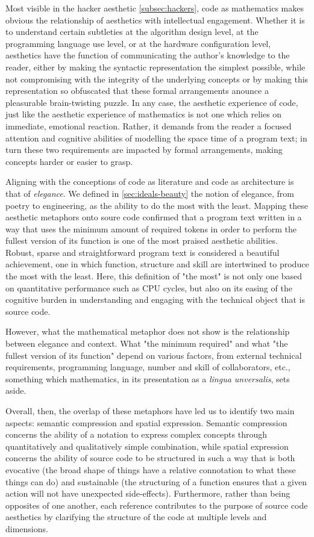 Most visible in the hacker aesthetic \ref{subsec:hackers}, code as mathematics makes obvious the relationship of aesthetics with intellectual engagement. Whether it is to understand certain subtleties at the algorithm design level, at the programming language use level, or at the hardware configuration level, aesthetics have the function of communicating the author's knowledge to the reader, either by making the syntactic representation the simplest possible, while not compromising with the integrity of the underlying concepts or by making this representation so obfuscated that these formal arrangements anounce a pleasurable brain-twisting puzzle. In any case, the aesthetic experience of code, just like the aesthetic experience of mathematics is not one which relies on immediate, emotional reaction. Rather, it demands from the reader a focused attention and cognitive abilities of modelling the space time of a program text; in turn these two requirements are impacted by formal arrangements, making concepts harder or easier to grasp.

Aligning with the conceptions of code as literature and code as architecture is that of \emph{elegance}. We defined in \ref{sec:ideals-beauty} the notion of elegance, from poetry to engineering, as the ability to do the most with the least. Mapping these aesthetic metaphors onto soure code confirmed that a program text written in a way that uses the minimum amount of required tokens in order to perform the fullest version of its function is one of the most praised aesthetic abilities. Robust, sparse and straightforward program text is considered a beautiful achievement, one in which function, structure and skill are intertwined to produce the most with the least. Here, this definition of "the most" is not only one based on quantitative performance such as CPU cycles, but also on its easing of the cognitive burden in understanding and engaging with the technical object that is source code.

However, what the mathematical metaphor does not show is the relationship between elegance and context. What "the minimum required" and what "the fullest version of its function" depend on various factors, from external technical requirements, programming language, number and skill of collaborators, etc., something which mathematics, in its presentation as a \emph{lingua unversalis}, sets aside.

Overall, then, the overlap of these metaphors have led us to identify two main aspects: semantic compression and spatial expression. Semantic compression concerns the ability of a notation to express complex concepts through quantitatively and qualitatively simple combination, while spatial expression concerns the ability of source code to be structured in such a way that is both evocative (the broad shape of things have a relative connotation to what these things can do) and sustainable (the structuring of a function ensures that a given action will not have unexpected side-effects). Furthermore, rather than being opposites of one another, each reference contributes to the purpose of source code aesthetics by clarifying the structure of the code at multiple levels and dimensions.

